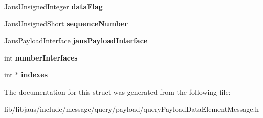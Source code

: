 \begin{DoxyCompactItemize}
\item 
\hypertarget{struct_query_payload_data_element_message_struct_af1946efc253c9a5bdbcc999b857447f8}{\-Jaus\-Unsigned\-Integer {\bfseries data\-Flag}}\label{struct_query_payload_data_element_message_struct_af1946efc253c9a5bdbcc999b857447f8}

\item 
\hypertarget{struct_query_payload_data_element_message_struct_a1ab0dc8beb659a5c6919cf7e51fbde8b}{\-Jaus\-Unsigned\-Short {\bfseries sequence\-Number}}\label{struct_query_payload_data_element_message_struct_a1ab0dc8beb659a5c6919cf7e51fbde8b}

\item 
\hypertarget{struct_query_payload_data_element_message_struct_ade99fee1699ff3df0df208e0c6b66ecb}{\hyperlink{struct_jaus_payload_interface_struct}{\-Jaus\-Payload\-Interface} {\bfseries jaus\-Payload\-Interface}}\label{struct_query_payload_data_element_message_struct_ade99fee1699ff3df0df208e0c6b66ecb}

\item 
\hypertarget{struct_query_payload_data_element_message_struct_a2cfbcb6019c7ed7e6bb4de2d8d83eec2}{int {\bfseries number\-Interfaces}}\label{struct_query_payload_data_element_message_struct_a2cfbcb6019c7ed7e6bb4de2d8d83eec2}

\item 
\hypertarget{struct_query_payload_data_element_message_struct_ae396d434636ea63862585e7cadda378a}{int $\ast$ {\bfseries indexes}}\label{struct_query_payload_data_element_message_struct_ae396d434636ea63862585e7cadda378a}

\end{DoxyCompactItemize}


\-The documentation for this struct was generated from the following file\-:\begin{DoxyCompactItemize}
\item 
lib/libjaus/include/message/query/payload/query\-Payload\-Data\-Element\-Message.\-h\end{DoxyCompactItemize}
